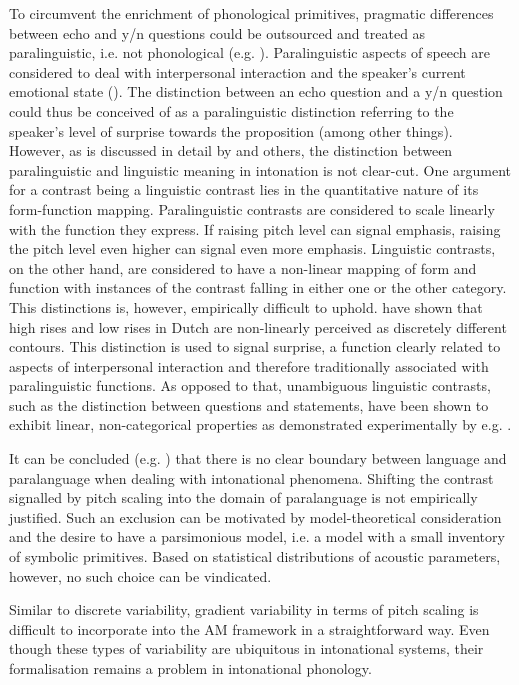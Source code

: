 To circumvent the enrichment of phonological primitives, pragmatic differences between echo and y/n questions could be outsourced and treated as paralinguistic, i.e. not phonological (e.g. \citealt{Pierr1980,Bolinger1989}). Paralinguistic aspects of speech are considered to deal with interpersonal interaction and the speaker’s current emotional state (\citealt{Ladd1983}). The distinction between an echo question and a y/n question could thus be conceived of as a paralinguistic distinction referring to the speaker’s level of surprise towards the proposition (among other things). However, as is discussed in detail by \citet{Ladd2008,Ladd2014} and others, the distinction between paralinguistic and linguistic meaning in intonation is not clear-cut. One argument for a contrast being a linguistic contrast lies in the quantitative nature of its form-function mapping. Paralinguistic contrasts are considered to scale linearly with the function they express. If raising pitch level can signal emphasis, raising the pitch level even higher can signal even more emphasis. Linguistic contrasts, on the other hand, are considered to have a non-linear mapping of form and function with instances of the contrast falling in either one or the other category. This distinctions is, however, empirically difficult to uphold. \citet{GussenhovenRietveld2000} have shown that high rises and low rises in Dutch are non-linearly perceived as discretely different contours. This distinction is used to signal surprise, a function clearly related to aspects of interpersonal interaction and therefore traditionally associated with paralinguistic functions. As opposed to that, unambiguous linguistic contrasts, such as the distinction between questions and statements, have been shown to exhibit linear, non-categorical properties as demonstrated experimentally by e.g. \citet{LaddMorton1997}.

\largerpage
It can be concluded (e.g. \citealt{Ladd2008}) that there is no clear boundary between language and paralanguage when dealing with intonational phenomena. Shifting the contrast signalled by pitch scaling into the domain of paralanguage is not empirically justified. Such an exclusion can be motivated by model-theoretical consideration and the desire to have a parsimonious model, i.e. a model with a small inventory of symbolic primitives. Based on statistical distributions of acoustic parameters, however, no such choice can be vindicated. 

Similar to discrete variability, gradient variability in terms of pitch scaling is difficult to incorporate into the AM framework in a straightforward way. Even though these types of variability are ubiquitous in intonational systems, their formalisation remains a problem in intonational phonology.

